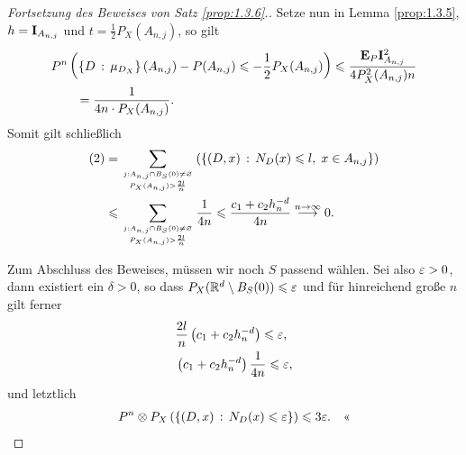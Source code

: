 \begin{proof}[Fortsetzung des Beweises von Satz \ref{prop:1.3.6}.]
Setze nun in Lemma \ref{prop:1.3.5}, $h=\mathbf{I}_{A_{n,j}}$ und
$t=\frac{1}{2}P_X(A_{n,j})$, so gilt
\begin{align*}
&P^n\left(\left\{ D\,:\,\mu_{D_X}\right\}(A_{n,j}) -P(A_{n,j}) \leqslant
-\frac{1}{2}P_X(A_{n,j}) \right)
\leqslant \frac{\textbf{E}_P \mathbf{I}^2_{A_{n,j}}}{4P_X^2(A_{n,j})n}\\
&\qquad= \frac{1}{4n\cdot P_X(A_{n,j})}.
\end{align*}
Somit gilt schließlich
\begin{align*}
\text{(2)} &= \sum_{\atop{j:A_{n,j}\cap B_S(0)\neq \varnothing}{P_X(A_{n,j})>
\frac{2l}{n}}} \left(\setdef{(D,x)}{N_D(x)\le l,\; x\in A_{n,j}}\right)\\
&\le
\sum_{\atop{j:A_{n,j}\cap B_S(0)\neq \varnothing}{P_X(A_{n,j})> \frac{2l}{n}}}
\frac{1}{4n}
\le \frac{c_1+c_2h_n^{-d}}{4n} \overset{n\to\infty}{\longrightarrow} 0.
\end{align*}

Zum Abschluss des Beweises, müssen wir noch $S$ passend wählen. Sei also $\varepsilon >
0$, dann existiert ein $\delta > 0$, so dass $P_X(\mathbb{R}^d\setminus B_S(0)) \leqslant
\varepsilon$ und für hinreichend große $n$ gilt ferner
\begin{align*}
&\frac{2l}{n}\left(c_1 + c_2h_n^{-d}\right) \leqslant \varepsilon,\\
&\left(c_1 + c_2h_n^{-d}\right)\frac{1}{4n} \leqslant \varepsilon,
\end{align*}
und letztlich
\begin{align*}
P^n\otimes P_X\left(\left\{ (D,x)\,:\,N_D(x)\leqslant \varepsilon\right\} \right)\leqslant 3\varepsilon.\quad\text{<<}
\end{align*}
\end{proof}

